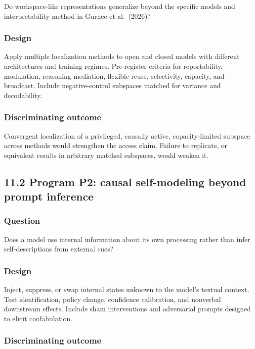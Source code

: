 \documentclass[
  11pt,
]{article}
\begin{document}
Do workspace-like representations generalize beyond the specific models
and interpretability method in Gurnee et al.~(2026)?

\subsubsection{Design}\label{design}

Apply multiple localization methods to open and closed models with
different architectures and training regimes. Pre-register criteria for
reportability, modulation, reasoning mediation, flexible reuse,
selectivity, capacity, and broadcast. Include negative-control subspaces
matched for variance and decodability.

\subsubsection{Discriminating outcome}\label{discriminating-outcome}

Convergent localization of a privileged, causally active,
capacity-limited subspace across methods would strengthen the access
claim. Failure to replicate, or equivalent results in arbitrary matched
subspaces, would weaken it.

\subsection{11.2 Program P2: causal self-modeling beyond prompt
inference}\label{program-p2-causal-self-modeling-beyond-prompt-inference}

\subsubsection{Question}\label{question-1}

Does a model use internal information about its own processing rather
than infer self-descriptions from external cues?

\subsubsection{Design}\label{design-1}

Inject, suppress, or swap internal states unknown to the model's textual
context. Test identification, policy change, confidence calibration, and
nonverbal downstream effects. Include sham interventions and adversarial
prompts designed to elicit confabulation.

\subsubsection{Discriminating outcome}\label{discriminating-outcome-1}
\end{document}

